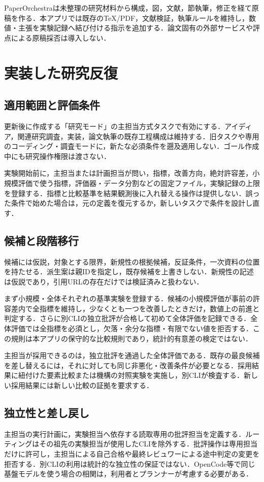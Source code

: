 \documentclass[submit,techrep,noauthor]{ipsj}
\begin{document}
PaperOrchestraは未整理の研究材料から構成，図，文献，節執筆，修正を経て原稿を作る\cite{orchestra}．本アプリでは既存のTeX/PDF，文献検証，執筆ルールを維持し，数値・主張を実験記録へ結び付ける指示を追加する．論文固有の外部サービスや評点による原稿採否は導入しない．

\section{実装した研究反復}
\subsection{適用範囲と評価条件}
更新後に作成する「研究モード」の主担当方式タスクで有効にする．アイディア，関連研究調査，実装，論文執筆の既存工程構成は維持する．旧タスクや専用のコーディング・調査モードに，新たな必須条件を遡及適用しない．ゴール作成中にも研究操作権限は渡さない．

実験開始前に，主担当または計画担当が問い，指標，改善方向，絶対許容差，小規模評価で使う指標，評価器・データ分割などの固定ファイル，実験記録の上限を登録する．指標と比較基準を結果観測後に入れ替える操作は提供しない．誤った条件で始めた場合は，元の定義を復元するか，新しいタスクで条件を設計し直す．

\subsection{候補と段階移行}
候補には仮説，対象とする限界，新規性の根拠候補，反証条件，一次資料の位置を持たせる．派生案は親IDを指定し，既存候補を上書きしない．新規性の記述は仮説であり，引用URLの存在だけでは検証済みと扱わない．

まず小規模・全体それぞれの基準実験を登録する．候補の小規模評価が事前の許容差内で全指標を維持し，少なくとも一つを改善したときだけ，数値上の前進と判定する．さらに別CLIの独立批評が合格して初めて全体評価を記録できる．全体評価では全指標を必須とし，欠落・余分な指標・有限でない値を拒否する．この規則は本アプリの保守的な比較規則であり，統計的有意差の検定ではない．

主担当が採用できるのは，独立批評を通過した全体評価である．既存の最良候補を差し替えるには，それに対しても同じ非悪化・改善条件が必要となる．採用結果に紐付けた要素比較または機構の対照実験を実施し，別CLIが検査する．新しい採用結果には新しい比較の証拠を要求する．

\subsection{独立性と差し戻し}
主担当の実行計画に，実験担当へ依存する読取専用の批評担当を定義する．ルーティングはその祖先の実験担当が使用したCLIを除外する．批評操作は専用担当だけに許可し，主担当による自己合格や最終レビュワーによる途中判定の変更を拒否する．別CLIの利用は統計的な独立性の保証ではない．OpenCode等で同じ基盤モデルを使う場合の相関は，利用者とプランナーが考慮する必要がある．
\end{document}

